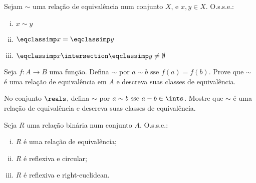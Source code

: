 \begin{exercise}
	Sejam $\sim$ uma relação de equivalência num conjunto $X$, e $x, y \in X$. O.s.s.e.:
	\begin{enumerate}[(i)]
		\item $x \sim y$
		\item $\eqclassimp x = \eqclassimp y$
		\item $\eqclassimp x \intersection \eqclassimp y \neq \emptyset$
	\end{enumerate}
\end{exercise}

\begin{exercise}
    Seja $f : A \to B$ uma função. Defina $\sim$ por $a \sim b \text{ sse } f(a) = f(b)$. Prove que $\sim$ é uma relação de equivalência em $A$ e descreva suas classes de equivalência.
\end{exercise}

\begin{exercise}
    No conjunto $\reals$, defina $\sim$ por $a \sim b \text{ sse } a - b \in \ints$. Mostre que $\sim$ é uma relação de equivalência e descreva suas classes de equivalência.
\end{exercise}

\begin{exercise}
	Seja $R$ uma relação binária num conjunto $A$. O.s.s.e.:
	\begin{enumerate}[(i)]
		\item $R$ é uma relação de equivalência;
		\item $R$ é reflexiva e circular;
		\item $R$ é reflexiva e right-euclidean.
	\end{enumerate}
\end{exercise}
